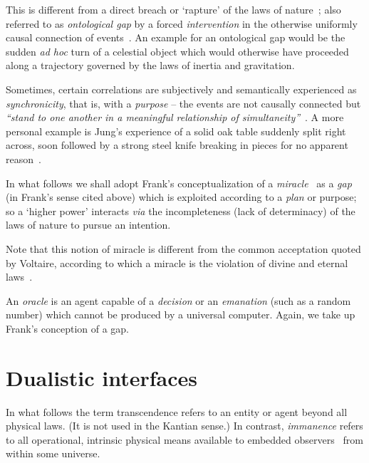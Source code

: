 This is different from a direct breach or `rapture' of the laws of nature~\cite[Sect.~II,~10]{frank,franke};
also referred to as {\em ontological gap} by a forced {\em intervention} in the otherwise uniformly causal connection of events~\cite[Sect.~3.C.3, Type~II]{Russel-nioda-1}.
An example for an ontological gap would be the sudden {\it ad hoc} turn of a celestial object which
would otherwise have proceeded along a trajectory governed by the laws of inertia and gravitation.

Sometimes, certain correlations are subjectively and semantically experienced as {\em synchronicity},
that is, with a {\em purpose} -- the events are not causally connected but {\em ``stand to one
another in a meaningful relationship of simultaneity''}~\cite{jung1,jung1e}.
A more personal example is Jung's experience of a solid oak table suddenly split right across,
soon followed by a strong steel knife breaking in pieces for no apparent reason~\cite[pp.~111-2, 104-5]{jung-memories,jung-memories-e}.

In what follows we shall adopt Frank's conceptualization of a {\em miracle}~\cite[Sect.~II,~15]{frank,franke}
as a {\em gap} (in Frank's sense cited above) which is exploited according to a {\em plan}  or purpose;
so a `higher power' interacts {\it via} the incompleteness (lack of determinacy) of the laws of nature to pursue an intention.

Note that this notion of miracle is different from the common acceptation quoted by Voltaire,
according to which a miracle is the violation of divine and eternal laws~\cite[Sect.~330]{voltaire-dict}.

An {\em oracle} is an agent capable of a {\em decision} or an {\em emanation} (such as a random number) which cannot be produced by a universal computer.
Again, we take up Frank's conception of a gap.



\chapter{Dualistic interfaces}
\label{2016-pu-book-chapter-di} %

In what follows the term transcendence refers to an entity or agent beyond
all physical laws.
(It is not used in the Kantian sense.)
In contrast, {\em immanence} refers to all operational, intrinsic physical
means available to embedded observers~\cite{toffoli:79,svozil-94} from within some universe.

